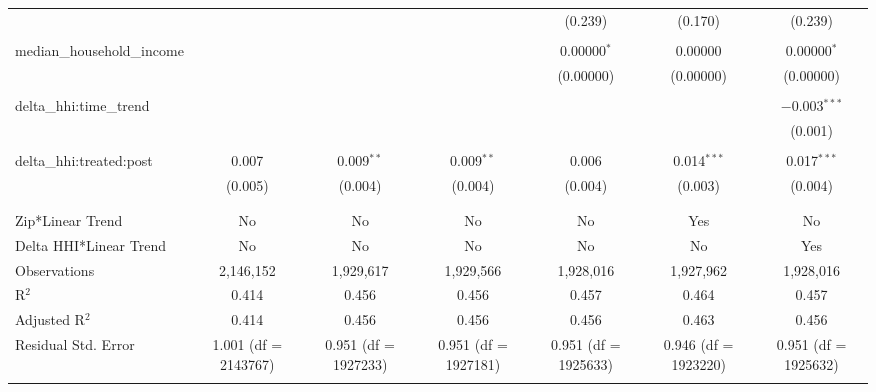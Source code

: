 \begin{table}[H]
{\begin{tabular}{@{\extracolsep{5pt}}lcccccc}
   &  &  &  & (0.239) & (0.170) & (0.239) \\  

   & & & & & & \\  

  median\_household\_income &  &  &  & 0.00000$^{*}$ & 0.00000 & 0.00000$^{*}$ \\  

   &  &  &  & (0.00000) & (0.00000) & (0.00000) \\  

   & & & & & & \\  

  delta\_hhi:time\_trend &  &  &  &  &  & $-$0.003$^{***}$ \\  

   &  &  &  &  &  & (0.001) \\  

   & & & & & & \\  

  delta\_hhi:treated:post & 0.007 & 0.009$^{**}$ & 0.009$^{**}$ & 0.006 & 0.014$^{***}$ & 0.017$^{***}$ \\  

   & (0.005) & (0.004) & (0.004) & (0.004) & (0.003) & (0.004) \\  

   & & & & & & \\  

 \hline \\[-1.8ex]  

 Zip*Linear Trend & No & No & No & No & Yes & No \\  

 Delta HHI*Linear Trend & No & No & No & No & No & Yes \\  

 Observations & 2,146,152 & 1,929,617 & 1,929,566 & 1,928,016 & 1,927,962 & 1,928,016 \\  

 R$^{2}$ & 0.414 & 0.456 & 0.456 & 0.457 & 0.464 & 0.457 \\  

 Adjusted R$^{2}$ & 0.414 & 0.456 & 0.456 & 0.456 & 0.463 & 0.456 \\  

 Residual Std. Error & 1.001 (df = 2143767) & 0.951 (df = 1927233) & 0.951 (df = 1927181) & 0.951 (df = 1925633) & 0.946 (df = 1923220) & 0.951 (df = 1925632) \\  

 \hline  

 \hline \\[-1.8ex]  


\end{tabular}}
\end{table}
